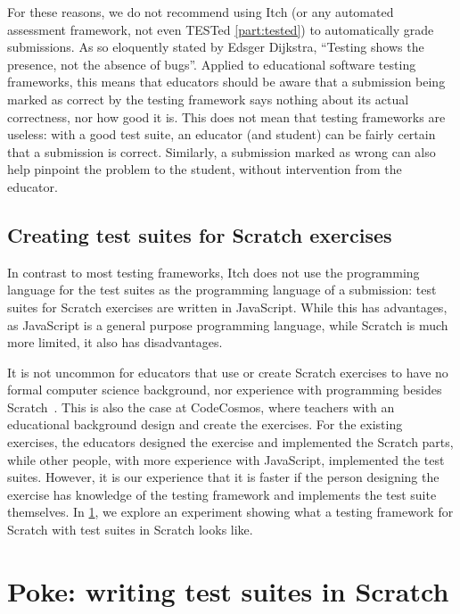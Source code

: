 \documentclass[../main]{subfiles}
\begin{document}
For these reasons, we do not recommend using Itch (or any automated assessment framework, not even TESTed \cref{part:tested}) to automatically grade submissions.
As so eloquently stated by Edsger Dijkstra, ``Testing shows the presence, not the absence of bugs''.
Applied to educational software testing frameworks, this means that educators should be aware that a submission being marked as correct by the testing framework says nothing about its actual correctness, nor how good it is.
This does not mean that testing frameworks are useless: with a good test suite, an educator (and student) can be fairly certain that a submission is correct.
Similarly, a submission marked as wrong can also help pinpoint the problem to the student, without intervention from the educator.

\subsection{Creating test suites for Scratch exercises}\label{subsec:creating-test-suites-for-scratch-exercises}

In contrast to most testing frameworks, Itch does not use the programming language for the test suites as the programming language of a submission: test suites for Scratch exercises are written in JavaScript.
While this has advantages, as JavaScript is a general purpose programming language, while Scratch is much more limited, it also has disadvantages.

It is not uncommon for educators that use or create Scratch exercises to have no formal computer science background, nor experience with programming besides Scratch~\autocite{kimEnhancingTeachersICT2012,oliveiraIntroductionComputationalThinking2019}.
This is also the case at CodeCosmos, where teachers with an educational background design and create the exercises.
For the existing exercises, the educators designed the exercise and implemented the Scratch parts, while other people, with more experience with JavaScript, implemented the test suites.
However, it is our experience that it is faster if the person designing the exercise has knowledge of the testing framework and implements the test suite themselves.
In \cref{sec:poke:-a-testing-framework-written-in-scratch}, we explore an experiment showing what a testing framework for Scratch with test suites in Scratch looks like.

\section{Poke: writing test suites in Scratch}\label{sec:poke:-a-testing-framework-written-in-scratch}
\end{document}
